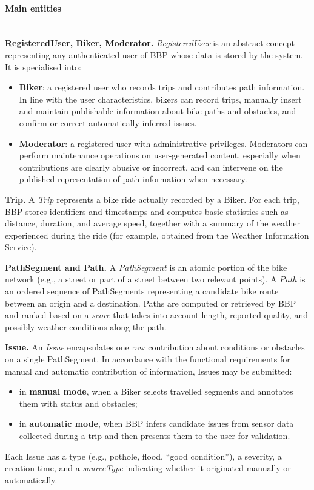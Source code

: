 \paragraph{Main entities}
\mbox{}\\
\textbf{RegisteredUser, Biker, Moderator.}
\textit{RegisteredUser} is an abstract concept representing any authenticated user of BBP whose data is stored by the system.
It is specialised into:
\begin{itemize}
    \item \textbf{Biker}: a registered user who records trips and contributes path information.
          In line with the user characteristics, bikers can record trips, manually insert and maintain publishable information about bike paths and obstacles, and confirm or correct automatically inferred issues.
    \item \textbf{Moderator}: a registered user with administrative privileges.
          Moderators can perform maintenance operations on user-generated content, especially when contributions are clearly abusive or incorrect, and can intervene on the published representation of path information when necessary.
\end{itemize}

\textbf{Trip.}
A \textit{Trip} represents a bike ride actually recorded by a Biker.
For each trip, BBP stores identifiers and timestamps and computes basic statistics such as distance, duration, and average speed, together with a summary of the weather experienced during the ride (for example, obtained from the Weather Information Service).

\textbf{PathSegment and Path.}
A \textit{PathSegment} is an atomic portion of the bike network (e.g., a street or part of a street between two relevant points).
A \textit{Path} is an ordered sequence of PathSegments representing a candidate bike route between an origin and a destination.
Paths are computed or retrieved by BBP and ranked based on a \textit{score} that takes into account length, reported quality, and possibly weather conditions along the path.

\textbf{Issue.}
An \textit{Issue} encapsulates one raw contribution about conditions or obstacles on a single PathSegment.
In accordance with the functional requirements for manual and automatic contribution of information, Issues may be submitted:
\begin{itemize}
    \item in \textbf{manual mode}, when a Biker selects travelled segments and annotates them with status and obstacles;
    \item in \textbf{automatic mode}, when BBP infers candidate issues from sensor data collected during a trip and then presents them to the user for validation.
\end{itemize}
Each Issue has a type (e.g., pothole, flood, ``good condition''), a severity, a creation time, and a \textit{sourceType} indicating whether it originated manually or automatically.

